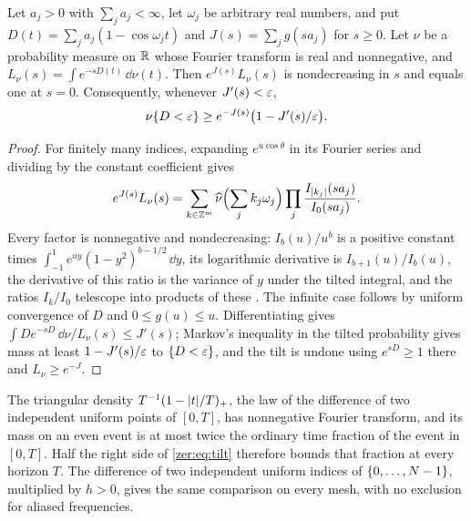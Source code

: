 \begin{lemma}\label{zer:lem:tilt}
Let $a_j>0$ with $\sum_ja_j<\infty$, let $\omega_j$ be arbitrary real numbers, and put
$D(t)=\sum_ja_j(1-\cos\omega_jt)$ and $J(s)=\sum_jg(sa_j)$ for $s\ge0$. Let $\nu$ be a probability
measure on $\mathbb{R}$ whose Fourier transform is real and nonnegative, and
$L_\nu(s)=\int e^{-sD(t)}\,\dd\nu(t)$. Then $e^{J(s)}L_\nu(s)$ is nondecreasing in $s$ and equals
one at $s=0$. Consequently, whenever $J'(s)<\varepsilon$,
\begin{equation}\label{zer:eq:tilt}
 \nu\{D<\varepsilon\}\ge e^{-J(s)}\bigl(1-J'(s)/\varepsilon\bigr).
\end{equation}
\end{lemma}
\begin{proof}
For finitely many indices, expanding $e^{u\cos\theta}$ in its Fourier series and dividing by the
constant coefficient gives
\[
 e^{J(s)}L_\nu(s)=\sum_{k\in\mathbb{Z}^m}\widehat\nu\Bigl(\sum_jk_j\omega_j\Bigr)\prod_j\frac{I_{\lvert k_j\rvert}(sa_j)}{I_0(sa_j)} .
\]
Every factor is nonnegative and nondecreasing: $I_b(u)/u^b$ is a positive constant times
$\int_{-1}^1e^{uy}(1-y^2)^{b-1/2}\,\dd y$, its logarithmic derivative is $I_{b+1}(u)/I_b(u)$, the
derivative of this ratio is the variance of $y$ under the tilted integral, and the ratios $I_k/I_0$
telescope into products of these \cite{NISTDLMFBessel}. The infinite case follows by uniform
convergence of $D$ and $0\le g(u)\le u$. Differentiating gives
$\int De^{-sD}\,\dd\nu/L_\nu(s)\le J'(s)$; Markov's inequality in the tilted probability gives mass at
least $1-J'(s)/\varepsilon$ to $\{D<\varepsilon\}$, and the tilt is undone using $e^{sD}\ge1$ there and
$L_\nu\ge e^{-J}$.
\end{proof}

The triangular density $T^{-1}(1-\lvert t\rvert/T)_+$, the law of the difference of two independent
uniform points of $[0,T]$, has nonnegative Fourier transform, and its mass on an even event is at
most twice the ordinary time fraction of the event in $[0,T]$. Half the right side of
\eqref{zer:eq:tilt} therefore bounds that fraction at every horizon $T$. The difference of two
independent uniform indices of $\{0,\dots,N-1\}$, multiplied by $h>0$, gives the same comparison
on every mesh, with no exclusion for aliased frequencies.

